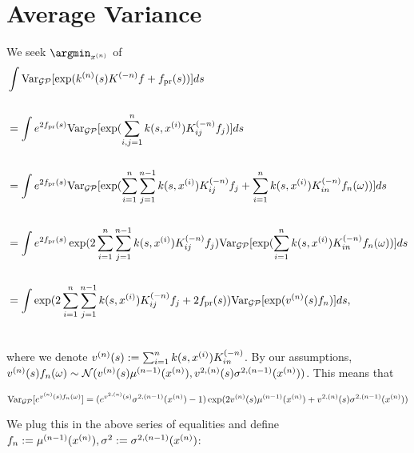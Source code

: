 \section{Average Variance}



We seek $\argmin_{\xn}$ of
\begin{align}
 \begin{split}
%
&\int  \vgp[ \exp( k^{(n)}(s)K^{(-n)}f + f_\pr(s) )]  ds  \\\\
%
&=\int e^{2f_\pr(s)}  \vgp[ \exp(\sum_{i,j=1}^{n} k(s,\xii)K_{ij}^{(-n)}f_j )  ]  ds\\\\
%
&=\int e^{2f_\pr(s)}  \vgp[ \exp(\sum_{i=1}^{n}\sum_{j=1}^{n-1}  k(s,\xii)K_{ij}^{(-n)}f_j + \sum_{i=1}^n k(s,\xii)K_{in}^{(-n)}f_n(\omega) )  ]  ds\\\\
%
&=\int e^{2f_\pr(s)}  \exp(2\sum_{i=1}^{n}\sum_{j=1}^{n-1}  k(s,\xii)K_{ij}^{(-n)}f_j)  \vgp[\exp( \sum_{i=1}^n k(s,\xii)K_{in}^{(-n)}f_n(\omega) ) ] ds\\\\
%
&=\int \exp(2\sum_{i=1}^{n}\sum_{j=1}^{n-1}  k(s,\xii)K_{ij}^{(-n)}f_j + 2f_\pr(s)) \vgp [\exp( \vns f_n )]  ds,\\\\
%
 \end{split}
\end{align}


where we denote $v^{(n)}(s) := \sum_{i=1}^n k(s,x^{(i)})K^{(-n)}_{in}$. By our assumptions, $v^{(n)}(s) f_n(\omega) \sim \mathcal{N}(v^{(n)}(s)\mu ^{(n-1)}(x^{(n)}),
v^{2,(n)}(s) \sigma^{2, (n-1)} (x^{(n)}))$.
This means that 

$$
\text{Var}_{\mathcal{GP}}[e^{v^{(n)}(s) f_n(\omega)}] = (e^{v^{2,(n)}(s)}\sigma^{2, (n-1)} (x^{(n)}) - 1) \exp( 2v^{(n)}(s)\mu ^{(n-1)}(x^{(n)}) + v^{2,(n)}(s)\sigma^{2, (n-1)} (x^{(n)}) )
$$

We plug this in the above series of equalities and define $f_n :=\mu ^{(n-1)}(x^{(n)}), \sigma^2: = \sigma^{2, (n-1)} (x^{(n)})$:

